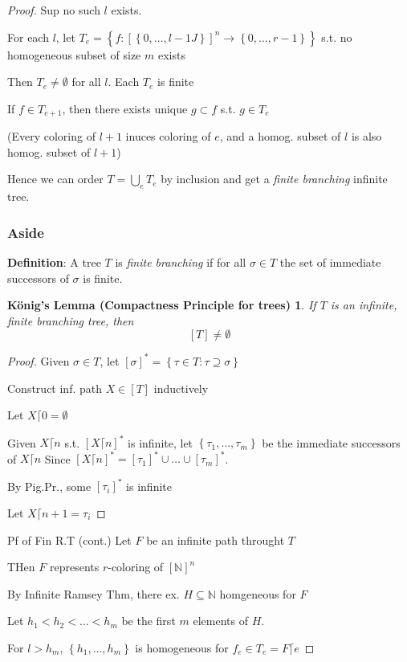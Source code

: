 \documentclass[12pt]{article}
\newcommand{\Nat}{\ensuremath{\mathbb{N}}}
\newcommand{\defn}{\textbf{Definition}: }
\begin{document}
\begin{proof}
  Sup no such $l$ exists.
  
  For each $l$, let
  $T_e = \left\{ f: \left[ \left\{ 0, \dots, l-1J \right\} \right]^n \rightarrow \left\{ 0, \dots, r-1 \right\}\right\}$
  s.t. no homogeneous subset of size $m$ exists

  Then $T_e \ne \emptyset$ for all $l$.
  Each $T_e$ is finite

  If $f \in T_{e+1}$, then there exists unique $g \subset f$ s.t. $g \in T_e$

  (Every coloring of $l+1$ inuces coloring of $e$, and a homog. subset of $l$ is also homog. subset of $l+1$)

  Hence we can order $T = \bigcup_{e} T_e$ by inclusion and get a \emph{finite branching} infinite tree.


\subsubsection*{Aside}
  \defn A tree $T$ is \emph{finite branching} if for all $\sigma \in T$
  the set of immediate successors of $\sigma$ is finite.

\newtheorem*{konig}{K\"onig's Lemma (Compactness Principle for trees)}
\begin{konig}
  If $T$ is an infinite, finite branching tree, then
  \[
      [T] \ne \emptyset
  \] %
\end{konig}
\begin{proof}
  Given $\sigma \in T$, let $[\sigma]^* = \left\{ \tau \in T : \tau \supseteq \sigma \right\}$

  Construct inf. path $X \in [T]$ inductively

  Let $X \lceil 0 = \emptyset$

  Given $X \lceil n$ s.t. $[ X \lceil n]^*$ is infinite,
  let $\left\{ \tau_1, \dots, \tau_m \right\}$ be the immediate successors of $X \lceil n$
  Since $[X \lceil n]^* = [\tau_1]^* \cup \dots \cup [\tau_m]^*$.

  By Pig.Pr., some $[\tau_i]^*$ is infinite

  Let $X \lceil n+1 = \tau_i$
\end{proof}

Pf of Fin R.T (cont.)
Let $F$ be an infinite path throught $T$

THen $F$ represents $r$-coloring of $[\Nat]^n$

By Infinite Ramsey Thm, there ex. $H \subseteq \Nat$ homgeneous for $F$

Let $h_1 < h_2 < \dots < h_m$ be the first $m$ elements of $H$.

For $l > h_m$, $\left\{ h_1, \dots, h_m \right\}$ is homogeneous for $f_e \in T_e= F\lceil e$
\end{proof}
\end{document}
